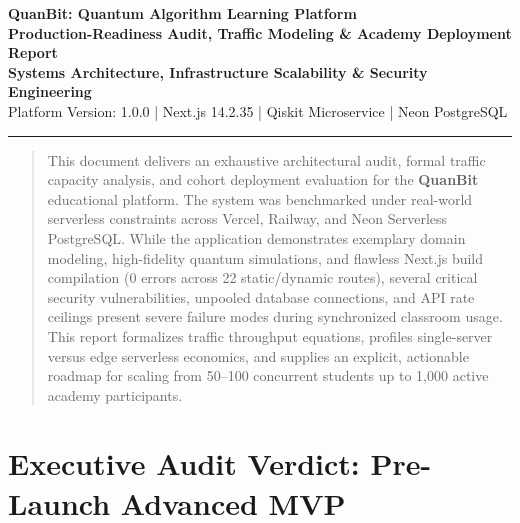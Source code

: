 \documentclass[11pt, a4paper]{article}
\begin{document}

\begin{center}
    {\Large \textbf{QuanBit: Quantum Algorithm Learning Platform}}\\[0.4em]
    {\LARGE \textbf{Production-Readiness Audit, Traffic Modeling \& Academy Deployment Report}}\\[0.8em]
    \textbf{Systems Architecture, Infrastructure Scalability \& Security Engineering}\\[0.3em]
    \textcolor{gray!80}{\small Platform Version: 1.0.0 \quad | \quad Next.js 14.2.35 \quad | \quad Qiskit Microservice \quad | \quad Neon PostgreSQL}
    \vspace{0.4cm}
    \hrule height 1pt
\end{center}

\vspace{0.3cm}

\begin{abstract}
\noindent This document delivers an exhaustive architectural audit, formal traffic capacity analysis, and cohort deployment evaluation for the \textbf{QuanBit} educational platform. The system was benchmarked under real-world serverless constraints across Vercel, Railway, and Neon Serverless PostgreSQL. While the application demonstrates exemplary domain modeling, high-fidelity quantum simulations, and flawless Next.js build compilation (0 errors across 22 static/dynamic routes), several critical security vulnerabilities, unpooled database connections, and API rate ceilings present severe failure modes during synchronized classroom usage. This report formalizes traffic throughput equations, profiles single-server versus edge serverless economics, and supplies an explicit, actionable roadmap for scaling from 50--100 concurrent students up to 1,000 active academy participants.
\end{abstract}

\vspace{0.4cm}

\section{Executive Audit Verdict: Pre-Launch Advanced MVP}
\end{document}
